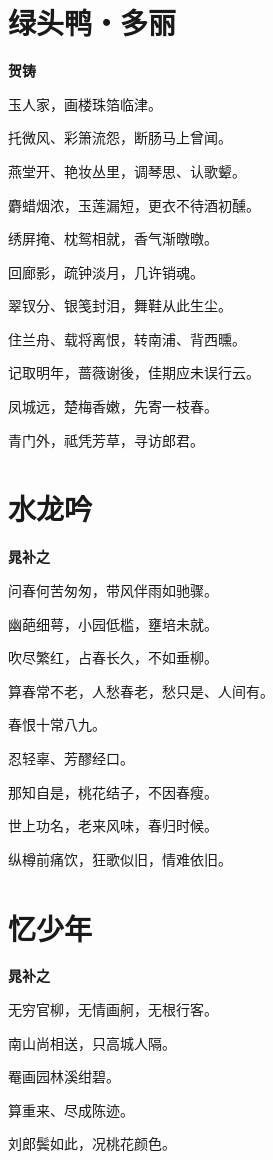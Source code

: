 \documentclass[12pt,a4paper]{ctexbook}
\begin{document}
\section{绿头鸭・多丽}
\textbf{贺铸}\par\vspace{0.5em}
玉人家，画楼珠箔临津。\par
托微风、彩箫流怨，断肠马上曾闻。\par
燕堂开、艳妆丛里，调琴思、认歌颦。\par
麝蜡烟浓，玉莲漏短，更衣不待酒初醺。\par
绣屏掩、枕鸳相就，香气渐暾暾。\par
回廊影，疏钟淡月，几许销魂。\par
翠钗分、银笺封泪，舞鞋从此生尘。\par
住兰舟、载将离恨，转南浦、背西曛。\par
记取明年，蔷薇谢後，佳期应未误行云。\par
凤城远，楚梅香嫩，先寄一枝春。\par
青门外，祗凭芳草，寻访郎君。\par

\section{水龙吟}
\textbf{晁补之}\par\vspace{0.5em}
问春何苦匆匆，带风伴雨如驰骤。\par
幽葩细萼，小园低槛，壅培未就。\par
吹尽繁红，占春长久，不如垂柳。\par
算春常不老，人愁春老，愁只是、人间有。\par
春恨十常八九。\par
忍轻辜、芳醪经口。\par
那知自是，桃花结子，不因春瘦。\par
世上功名，老来风味，春归时候。\par
纵樽前痛饮，狂歌似旧，情难依旧。\par

\section{忆少年}
\textbf{晁补之}\par\vspace{0.5em}
无穷官柳，无情画舸，无根行客。\par
南山尚相送，只高城人隔。\par
罨画园林溪绀碧。\par
算重来、尽成陈迹。\par
刘郎鬓如此，况桃花颜色。\par
\end{document}
